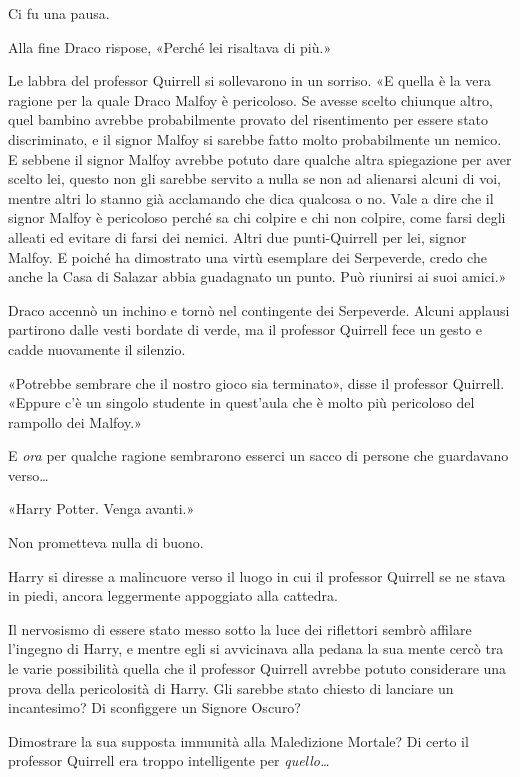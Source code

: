 Ci fu una pausa.

Alla fine Draco rispose, «Perché lei risaltava di più.»

Le labbra del professor Quirrell si sollevarono in un sorriso. «E quella è la vera ragione per la quale Draco Malfoy è pericoloso. Se avesse scelto chiunque altro, quel bambino avrebbe probabilmente provato del risentimento per essere stato discriminato, e il signor Malfoy si sarebbe fatto molto probabilmente un nemico. E sebbene il signor Malfoy avrebbe potuto dare qualche altra spiegazione per aver scelto lei, questo non gli sarebbe servito a nulla se non ad alienarsi alcuni di voi, mentre altri lo stanno già acclamando che dica qualcosa o no. Vale a dire che il signor Malfoy è pericoloso perché sa chi colpire e chi non colpire, come farsi degli alleati ed evitare di farsi dei nemici. Altri due punti-Quirrell per lei, signor Malfoy. E poiché ha dimostrato una virtù esemplare dei Serpeverde, credo che anche la Casa di Salazar abbia guadagnato un punto. Può riunirsi ai suoi amici.»

Draco accennò un inchino e tornò nel contingente dei Serpeverde. Alcuni applausi partirono dalle vesti bordate di verde, ma il professor Quirrell fece un gesto e cadde nuovamente il silenzio.

«Potrebbe sembrare che il nostro gioco sia terminato», disse il professor Quirrell. «Eppure c’è un singolo studente in quest’aula che è molto più pericoloso del rampollo dei Malfoy.»

E \textit{ora} per qualche ragione sembrarono esserci un sacco di persone che guardavano verso…

«Harry Potter. Venga avanti.»

Non prometteva nulla di buono.

Harry si diresse a malincuore verso il luogo in cui il professor Quirrell se ne stava in piedi, ancora leggermente appoggiato alla cattedra.

Il nervosismo di essere stato messo sotto la luce dei riflettori sembrò affilare l’ingegno di Harry, e mentre egli si avvicinava alla pedana la sua mente cercò tra le varie possibilità quella che il professor Quirrell avrebbe potuto considerare una prova della pericolosità di Harry. Gli sarebbe stato chiesto di lanciare un incantesimo? Di sconfiggere un Signore Oscuro?

Dimostrare la sua supposta immunità alla Maledizione Mortale? Di certo il professor Quirrell era troppo intelligente per \textit{quello…}


